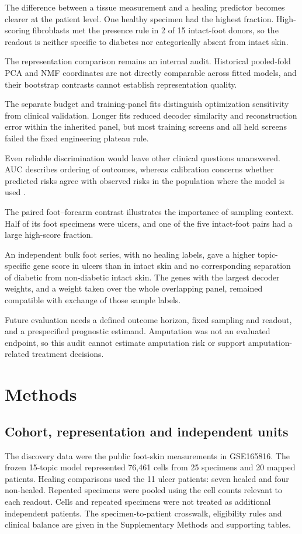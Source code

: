 \documentclass[10pt,a4paper]{article}
\begin{document}
The difference between a tissue measurement and a healing predictor becomes clearer at the patient level. One healthy specimen had the highest fraction. High-scoring fibroblasts met the presence rule in 2 of 15 intact-foot donors, so the readout is neither specific to diabetes nor categorically absent from intact skin.

The representation comparison remains an internal audit. Historical pooled-fold PCA and NMF coordinates are not directly comparable across fitted models, and their bootstrap contrasts cannot establish representation quality.

The separate budget and training-panel fits distinguish optimization sensitivity from clinical validation. Longer fits reduced decoder similarity and reconstruction error within the inherited panel, but most training screens and all held screens failed the fixed engineering plateau rule.

Even reliable discrimination would leave other clinical questions unanswered. AUC describes ordering of outcomes, whereas calibration concerns whether predicted risks agree with observed risks in the population where the model is used \citep{steyerberg2010,vancalster2019}.

The paired foot--forearm contrast illustrates the importance of sampling context. Half of its foot specimens were ulcers, and one of the five intact-foot pairs had a large high-score fraction.

An independent bulk foot series, with no healing labels, gave a higher topic-specific gene score in ulcers than in intact skin and no corresponding separation of diabetic from non-diabetic intact skin. The genes with the largest decoder weights, and a weight taken over the whole overlapping panel, remained compatible with exchange of those sample labels.

Future evaluation needs a defined outcome horizon, fixed sampling and readout, and a prespecified prognostic estimand. Amputation was not an evaluated endpoint, so this audit cannot estimate amputation risk or support amputation-related treatment decisions.


\section{Methods}
\subsection{Cohort, representation and independent units}
The discovery data were the public foot-skin measurements in GSE165816. The frozen 15-topic model represented 76,461 cells from 25 specimens and 20 mapped patients. Healing comparisons used the 11 ulcer patients: seven healed and four non-healed. Repeated specimens were pooled using the cell counts relevant to each readout. Cells and repeated specimens were not treated as additional independent patients. The specimen-to-patient crosswalk, eligibility rules and clinical balance are given in the Supplementary Methods and supporting tables.
\end{document}
